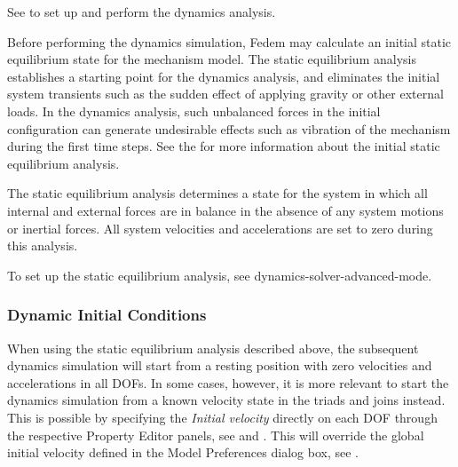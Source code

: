 See 
to set up and perform the dynamics analysis.


Before performing the dynamics simulation, Fedem may calculate an initial static
equilibrium state for the mechanism model. The static equilibrium analysis
establishes a starting point for the dynamics analysis, and eliminates the
initial system transients such as the sudden effect of applying gravity or other
external loads. In the dynamics analysis, such unbalanced forces in the initial
configuration can generate undesirable effects such as vibration of
the mechanism during the first time steps.
See the 
for more information about the initial static equilibrium analysis.

The static equilibrium analysis determines a state for the system in which all
internal and external forces are in balance in the absence of any system motions
or inertial forces.
All system velocities and accelerations are set to zero during this analysis.

To set up the static equilibrium analysis, see
              {dynamics-solver-advanced-mode}.

\subsubsection{Dynamic Initial Conditions}

When using the static equilibrium analysis described above,
the subsequent dynamics simulation will start from a resting position with
zero velocities and accelerations in all DOFs. In some cases, however,
it is more relevant to start the dynamics simulation from a known velocity
state in the triads and joins instead. This is possible by specifying
the {\sl Initial velocity} directly on each DOF through the respective
Property Editor panels, see 
and .
This will override the global initial velocity defined in the Model Preferences
dialog box, see .


